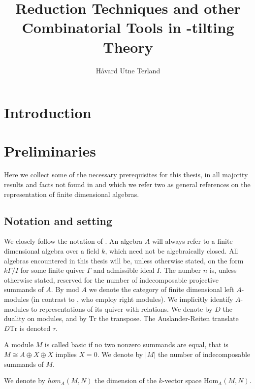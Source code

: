 \documentclass[]{article}
\title{Reduction Techniques and other Combinatorial Tools in \tu-tilting Theory}
\author{Håvard Utne Terland}
\theoremstyle{definition}
\newcommand{\mo}{\ensuremath{\text{mod }}}
\begin{document}
\maketitle

\begin{abstract}

\end{abstract}

\section{Introduction}


\section{Preliminaries}
Here we collect some of the necessary prerequisites for this thesis, in all majority results and facts not found in \cite{auslander_reiten_smalo_1995} and \cite{assem_skowronski_simson_2006} which we refer two as general references on the representation of finite dimensional algebras.

\subsection{Notation and setting}
We closely follow the notation of \cite{assem_skowronski_simson_2006}. An algebra $A$ will always refer to a finite dimensional algebra over a field $k$, which need not be algebraically closed. All algebras encountered in this thesis will be, unless otherwise stated, on the form $k\Gamma/I$ for some finite quiver $\Gamma$ and admissible ideal $I$. The number $n$ is, unless otherwise stated, reserved for the number of indecomposable projective summands of $A$. By $\mo A$ we denote the category of finite dimensional left $A$-modules (in contrast to \cite{assem_skowronski_simson_2006}, who employ right modules). We implicitly identify $A$-modules to representations of its quiver with relations. We denote by $D$ the duality on modules, and by $\text{Tr}$ the transpose. The Auslander-Reiten translate $D\text{Tr}$ is denoted $\tau$.

A module $M$ is called basic if no two nonzero summands are equal, that is $M \cong A \oplus X \oplus X$ implies $X = 0$. We denote by $|M|$ the number of indecomposable summands of $M$. 

We denote by $hom_A(M,N)$ the dimension of the $k$-vector space $\text{Hom}_A(M,N)$.
\end{document}
